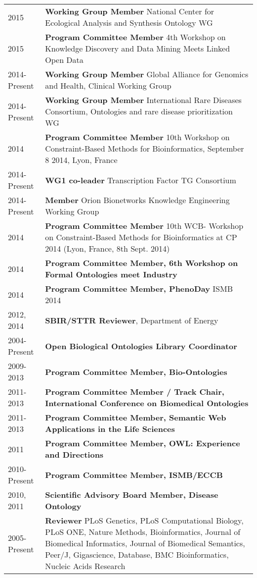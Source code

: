 \documentclass[11pt,fullpage]{article}
\begin{document}
\begin{longtable}{p{0.5in}|p{5.5in}}

2015  & \textbf{Working Group Member}  National Center for Ecological
Analysis and Synthesis Ontology WG \\
2015  & \textbf{Program Committee Member}  4th Workshop on Knowledge Discovery and Data Mining Meets Linked Open Data \\
2014-Present  & \textbf{Working Group Member}  Global Alliance for Genomics and Health, Clinical Working Group \\
2014-Present  & \textbf{Working Group Member}  International Rare Diseases Consortium, Ontologies and rare disease prioritization WG \\
2014  & \textbf{Program Committee Member}  10th Workshop on Constraint-Based Methods for Bioinformatics, September 8 2014, Lyon, France \\
2014-Present  & \textbf{WG1 co-leader} Transcription Factor TG Consortium \\
2014-Present  & \textbf{Member} Orion Bionetworks Knowledge Engineering Working Group \\
2014 & \textbf{Program Committee Member} 10th WCB- Workshop on Constraint-Based Methods for Bioinformatics at CP 2014 (Lyon, France, 8th Sept. 2014) \\
2014 & \textbf{Program Committee Member, 6th Workshop on Formal Ontologies meet Industry}\\
2014 & \textbf{Program Committee Member, PhenoDay} ISMB 2014\\
2012, 2014 & \textbf{SBIR/STTR Reviewer}, Department of Energy \\
2004-Present  & \textbf{Open Biological Ontologies Library Coordinator} \\
2009-2013  & \textbf{Program Committee Member, Bio-Ontologies} \\
2011-2013 & \textbf{Program Committee Member / Track Chair, International Conference on Biomedical Ontologies}\\
2011-2013 & \textbf{Program Committee Member, Semantic Web  Applications in the Life Sciences}\\
2011 & \textbf{Program Committee Member, OWL: Experience and Directions} \\
2010-Present & \textbf{Program Committee Member, ISMB/ECCB} \\
2010, 2011 & \textbf{Scientific Advisory Board Member, Disease Ontology} \\
2005-Present  & \textbf{Reviewer} PLoS Genetics, PLoS Computational
Biology, PLoS ONE, Nature Methods, Bioinformatics, Journal of
Biomedical Informatics, Journal of Biomedical Semantics, Peer/J, Gigascience, Database, BMC Bioinformatics, Nucleic Acids Research\\

\end{longtable}
\end{document}

